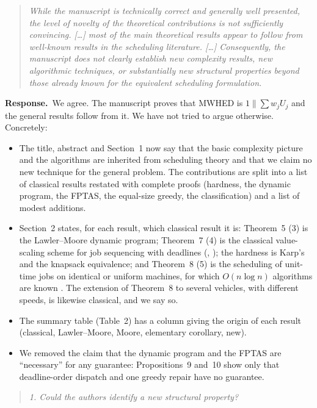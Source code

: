 \documentclass[11pt]{article}
\newenvironment{comment}{\par\medskip\begin{quote}\small\itshape}{\end{quote}}
\newcommand{\reply}{\noindent\textbf{Response.}\ }
\begin{document}
\begin{comment}
While the manuscript is technically correct and generally well
presented, the level of novelty of the theoretical contributions is not
sufficiently convincing. [\dots] most of the main theoretical results
appear to follow from well-known results in the scheduling literature.
[\dots] Consequently, the manuscript does not clearly establish new
complexity results, new algorithmic techniques, or substantially new
structural properties beyond those already known for the equivalent
scheduling formulation.
\end{comment}

\reply We agree. The manuscript proves that MWHED is
$1\|\sum w_jU_j$ and the general results follow from it. We have not
tried to argue otherwise. Concretely:

\begin{itemize}[leftmargin=*,itemsep=2pt]
\item The title, abstract and Section~1 now say that the basic
complexity picture and the algorithms are inherited from scheduling
theory and that we claim no new technique for the general problem. The
contributions are split into a list of classical results restated with
complete proofs (hardness, the dynamic program, the FPTAS, the
equal-size greedy, the classification) and a list of modest additions.
\item Section~2 states, for each result, which classical result it is:
Theorem~5 (3) is the Lawler--Moore dynamic program; Theorem~7 (4) is the
classical value-scaling scheme for job sequencing with deadlines
(\citealt{sahni1976}, \citealt{gensl1981}); the hardness is Karp's
\citep{karp1972} and the knapsack equivalence; and Theorem~8 (5) is the
scheduling of unit-time jobs on identical or uniform machines, for which
$O(n\log n)$ algorithms are known \citep{lawler1976,dessouky1990}.
The extension of Theorem~8 to several vehicles, with different
speeds, is likewise classical, and we say so.
\item The summary table (Table~2) has a column giving the origin of each
result (classical, Lawler--Moore, Moore, elementary corollary, new).
\item We removed the claim that the dynamic program and the FPTAS are
``necessary'' for any guarantee: Propositions~9 and~10 show only that
deadline-order dispatch and one greedy repair have no guarantee.
\end{itemize}

\begin{comment}
1. Could the authors identify a new structural property?
\end{comment}
\end{document}
